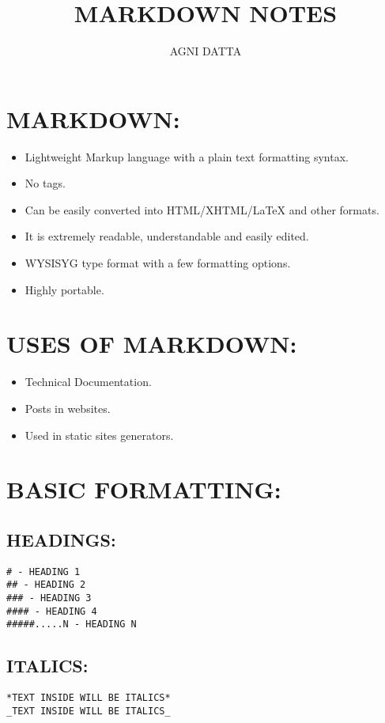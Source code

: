 \documentclass[10pt]{article}
\begin{document}
\title{\textbf{MARKDOWN NOTES}}
\author{AGNI DATTA}

\maketitle
{\small{}\tableofcontents{}}{\small\par}

\pagebreak{}

\section{MARKDOWN:}
\begin{itemize}
\item Lightweight Markup language with a plain text formatting syntax.
\item No tags.
\item Can be easily converted into HTML/XHTML/\LaTeX\: and other formats.
\item It is extremely readable, understandable and easily edited.
\item WYSISYG type format with a few formatting options.
\item Highly portable.
\end{itemize}

\section{USES OF MARKDOWN:}
\begin{itemize}
\item Technical Documentation.
\item Posts in websites.
\item Used in static sites generators.
\end{itemize}

\section{BASIC FORMATTING:}

\subsection{HEADINGS:}
\begin{verbatim}
# - HEADING 1
## - HEADING 2
### - HEADING 3
#### - HEADING 4
#####.....N - HEADING N
\end{verbatim}

\subsection{ITALICS:}
\begin{verbatim}
*TEXT INSIDE WILL BE ITALICS*
_TEXT INSIDE WILL BE ITALICS_
\end{verbatim}
\end{document}
